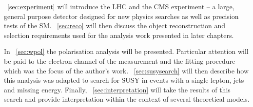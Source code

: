 \chap~\ref{sec:experiment} will introduce the \ac{LHC} and the \ac{CMS}
experiment -- a large, general purpose detector designed for new physics
searches as well as precision tests of the \ac{SM}. \chap~\ref{sec:reco} will
then discuss the object reconstruction and selection requirements used for the
analysis work presented in later chapters.

In \chap~\ref{sec:wpol} the \PW polarisation analysis will be
presented. Particular attention will be paid to the electron channel of the
measurement and the fitting procedure which was the focus of the author's
work. \chap~\ref{sec:susysearch} will then describe how this analysis was
adapted to search for \ac{SUSY} in events with a single lepton, jets and missing
energy. Finally, \chap~\ref{sec:interpretation} will take the results of this
search and provide interpretation within the context of several theoretical
models.
